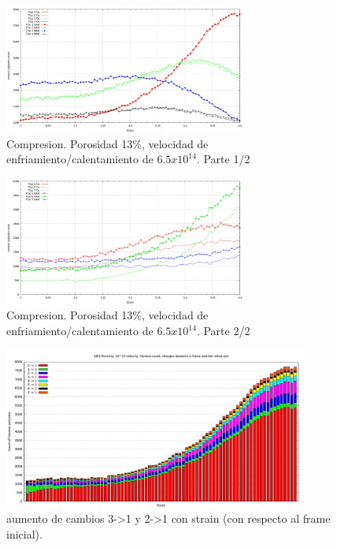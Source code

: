 \documentclass[10pt, oneside]{article} %
\begin{document}
\begin{figure}[H]
\centering
\includegraphics[width=8cm]{Figures/Porosidad_2vel_voronoi_13_14_comp.png}
\caption{Compresion. Porosidad 13\%, velocidad de enfriamiento/calentamiento de $6.5x10^{14}$. Parte 1/2}
\label{fg:8comp}
\end{figure}

\begin{figure}[H]
\centering
\includegraphics[width=8cm]{Figures/Porosidad_2vel_voronoi_13_14_comp2.png}
\caption{Compresion. Porosidad 13\%, velocidad de enfriamiento/calentamiento de $6.5x10^{14}$. Parte 2/2}
\label{fg:9comp}
\end{figure}

\begin{figure}[H]
\centering
\includegraphics[width=10cm]{Figures/Porosidad_2vel_comp_voronoi_hist1.png}
\caption{aumento de cambios 3->1 y 2->1 con strain (con respecto al frame inicial).}
\label{fg:10comp}
\end{figure}
\end{document}
